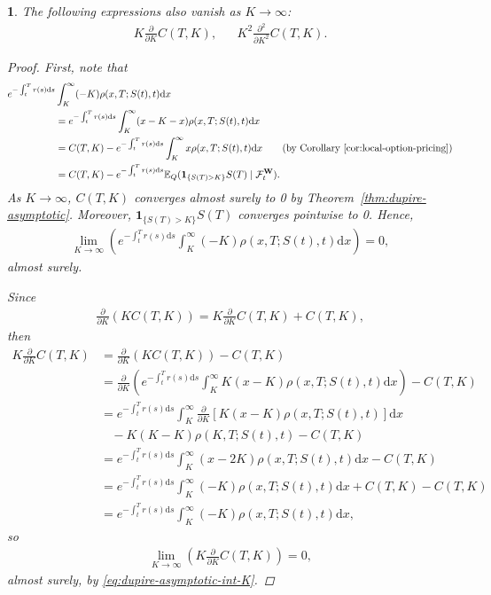 \documentclass[english]{article}
\numberwithin{equation}{section}
\numberwithin{figure}{section}
\theoremstyle{bolddescit}
\theoremstyle{definition}
\theoremstyle{definition}
\theoremstyle{plain}
\newtheorem{lemma}[theorem]{\protect\lemmaname}
\theoremstyle{plain}
\theoremstyle{bolddesc}
\theoremstyle{plain}
\theoremstyle{remark}
\providecommand{\lemmaname}{Lemma}
\begin{document}
\begin{lemma}\label{lem:dupire-asymptotic-dK}
  The following expressions also vanish as $K \to \infty$:
  \begin{align*}
    K \frac{\partial}{\partial K} C(T,K), && K^2 \frac{\partial^2}{\partial K^2} C(T,K).
  \end{align*}

  \begin{proof}
    First, note that
    \begin{align*}
      e^{-\int_t^T r(s) \mathrm{d}s}& \int_K^\infty (-K) \rho(x,T;S(t),t)\mathrm{d}x\\
      &= e^{-\int_t^T r(s) \mathrm{d}s} \int_K^\infty (x-K-x) \rho(x,T;S(t),t)\mathrm{d}x\\
      &= C(T,K) - e^{-\int_t^T r(s) \mathrm{d}s} \int_K^\infty x \rho(x,T;S(t),t)\mathrm{d}x \tag{by Corollary~\ref{cor:local-option-pricing}}\\
      &= C(T,K) - e^{-\int_t^T r(s) \mathrm{d}s} \mathbb{E}_Q(\mathbf{1}_{\{S(T) > K\}} S(T) \mid \mathcal{F}^\mathbf{W}_t).
    \end{align*}
    As $K \to \infty$, $C(T,K)$ converges almost surely to 0 by Theorem~\ref{thm:dupire-asymptotic}. Moreover, $\mathbf{1}_{\{S(T) > K\}} S(T)$ converges pointwise to 0. Hence,
    \begin{align}
      \lim_{K \to \infty} \left(e^{-\int_t^T r(s) \mathrm{d}s} \int_K^\infty (-K) \rho(x,T;S(t),t)\mathrm{d}x\right) = 0,\label{eq:dupire-asymptotic-int-K}
    \end{align}
    almost surely.

    Since
    \begin{align*}
      \frac{\partial}{\partial K} (K C(T,K)) = K \frac{\partial}{\partial K} C(T,K) + C(T,K),
    \end{align*}
    then
    \begin{align*}
      K \frac{\partial}{\partial K} C(T,K)
      &= \frac{\partial}{\partial K} (K C(T,K)) - C(T,K)\\
      &= \frac{\partial}{\partial K} \left(e^{-\int_t^T r(s) \mathrm{d}s} \int_K^\infty K(x-K) \rho(x,T;S(t),t)\mathrm{d}x \right) - C(T,K)\\
      &= e^{-\int_t^T r(s) \mathrm{d}s} \int_K^\infty \frac{\partial}{\partial K} \left[K(x-K) \rho(x,T;S(t),t)\right]\mathrm{d}x\\
        &\ \ \ \ - K(K-K)\rho(K,T;S(t),t) - C(T,K) \tag{Leibniz Integral Rule}\\
      &= e^{-\int_t^T r(s) \mathrm{d}s} \int_K^\infty (x-2K) \rho(x,T;S(t),t)\mathrm{d}x - C(T,K)\\
      &= e^{-\int_t^T r(s) \mathrm{d}s} \int_K^\infty (-K) \rho(x,T;S(t),t)\mathrm{d}x + C(T,K) - C(T,K)\\
      &= e^{-\int_t^T r(s) \mathrm{d}s} \int_K^\infty (-K) \rho(x,T;S(t),t)\mathrm{d}x,
    \end{align*}
    so
    \begin{align}
      \lim_{K \to \infty} \left(K \frac{\partial}{\partial K} C(T,K)\right)
      = 0,\label{eq:dupire-asymptotic-dK}
    \end{align}
    almost surely, by \eqref{eq:dupire-asymptotic-int-K}.


\end{proof}
\end{lemma}
\end{document}
